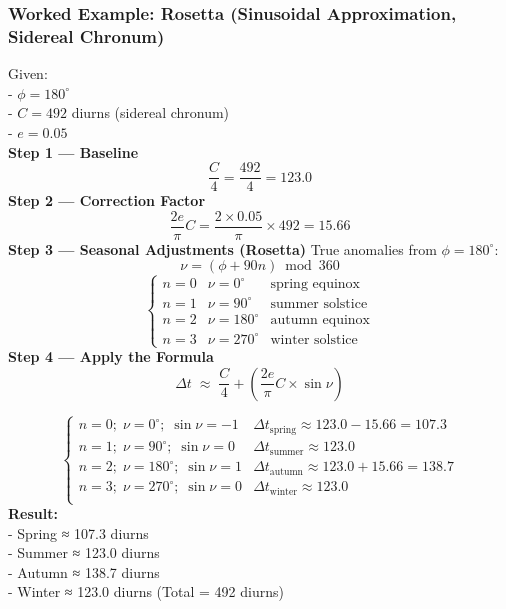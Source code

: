 \documentclass[
  letterpaper,
]{book}
\begin{document}
\subsubsection{Worked Example: Rosetta (Sinusoidal Approximation,
Sidereal
Chronum)}\label{worked-example-rosetta-sinusoidal-approximation-sidereal-chronum}

Given:\\
- \(\phi = 180^\circ\)\\
- \(C = 492\) diurns (sidereal chronum)\\
- \(e = 0.05\)\\
\textbf{Step 1 --- Baseline} \[
\frac{C}{4} = \frac{492}{4} = 123.0
\] \textbf{Step 2 --- Correction Factor} \[
\frac{2e}{\pi} C = \frac{2 \times 0.05}{\pi} \times 492 = 15.66
\] \textbf{Step 3 --- Seasonal Adjustments (Rosetta)} True anomalies
from \(\phi = 180^\circ\): \[
\nu = (\phi + 90n) \bmod 360
\] \[
\begin{cases}
n = 0 & \nu = 0^\circ & \text{spring equinox} \\
n = 1 & \nu = 90^\circ & \text{summer solstice} \\
n = 2 & \nu = 180^\circ   & \text{autumn equinox} \\
n = 3 & \nu = 270^\circ  & \text{winter solstice}
\end{cases}
\] \textbf{Step 4 --- Apply the Formula} \[
\Delta t \;\approx\; \frac{C}{4} + \left(\frac{2e}{\pi} C \times \sin\nu\right)
\]

\[
\begin{cases}
n=0;\;\nu=0^\circ;\;\sin\nu=-1 & \Delta t_\text{spring} \approx 123.0 - 15.66 = 107.3 \\
n=1;\;\nu=90^\circ;\;\sin\nu=0 & \Delta t_\text{summer} \approx 123.0 \\
n=2;\;\nu=180^\circ;\;\sin\nu=1 & \Delta t_\text{autumn} \approx 123.0 + 15.66 = 138.7 \\
n=3;\;\nu=270^\circ;\;\sin\nu=0 & \Delta t_\text{winter} \approx 123.0 \\
\end{cases}
\] \textbf{Result:}\\
- Spring ≈ 107.3 diurns\\
- Summer ≈ 123.0 diurns\\
- Autumn ≈ 138.7 diurns\\
- Winter ≈ 123.0 diurns (Total = 492 diurns)
\end{document}
